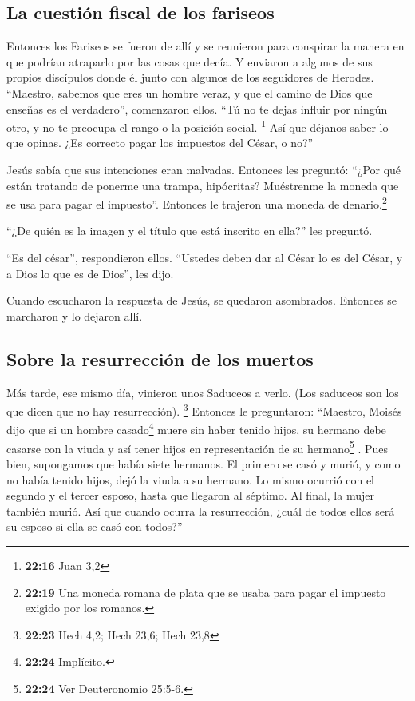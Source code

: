 \hypertarget{la-cuestiuxf3n-fiscal-de-los-fariseos}{%
\subsection{La cuestión fiscal de los
fariseos}\label{la-cuestiuxf3n-fiscal-de-los-fariseos}}

 Entonces los Fariseos se fueron de allí y se reunieron
para conspirar la manera en que podrían atraparlo por las cosas que
decía.  Y enviaron a algunos de sus propios discípulos
donde él junto con algunos de los seguidores de Herodes. ``Maestro,
sabemos que eres un hombre veraz, y que el camino de Dios que enseñas es
el verdadero'', comenzaron ellos. ``Tú no te dejas influir por ningún
otro, y no te preocupa el rango o la posición social. \footnote{\textbf{22:16}
  Juan 3,2}  Así que déjanos saber lo que opinas. ¿Es
correcto pagar los impuestos del César, o no?''

 Jesús sabía que sus intenciones eran malvadas. Entonces
les preguntó: ``¿Por qué están tratando de ponerme una trampa,
hipócritas?  Muéstrenme la moneda que se usa para pagar
el impuesto''. Entonces le trajeron una moneda de denario.\footnote{\textbf{22:19}
  Una moneda romana de plata que se usaba para pagar el impuesto exigido
  por los romanos.}

 ``¿De quién es la imagen y el título que está inscrito
en ella?'' les preguntó.

 ``Es del césar'', respondieron ellos. ``Ustedes deben
dar al César lo es del César, y a Dios lo que es de Dios'', les dijo.

 Cuando escucharon la respuesta de Jesús, se quedaron
asombrados. Entonces se marcharon y lo dejaron allí.

\hypertarget{sobre-la-resurrecciuxf3n-de-los-muertos}{%
\subsection{Sobre la resurrección de los
muertos}\label{sobre-la-resurrecciuxf3n-de-los-muertos}}

 Más tarde, ese mismo día, vinieron unos Saduceos a
verlo. (Los saduceos son los que dicen que no hay resurrección).
\footnote{\textbf{22:23} Hech 4,2; Hech 23,6; Hech 23,8} 
Entonces le preguntaron: ``Maestro, Moisés dijo que si un hombre
casado\footnote{\textbf{22:24} Implícito.} muere sin haber tenido hijos,
su hermano debe casarse con la viuda y así tener hijos en representación
de su hermano\footnote{\textbf{22:24} Ver Deuteronomio 25:5-6.} .
 Pues bien, supongamos que había siete hermanos. El
primero se casó y murió, y como no había tenido hijos, dejó la viuda a
su hermano.  Lo mismo ocurrió con el segundo y el tercer
esposo, hasta que llegaron al séptimo.  Al final, la
mujer también murió.  Así que cuando ocurra la
resurrección, ¿cuál de todos ellos será su esposo si ella se casó con
todos?''

